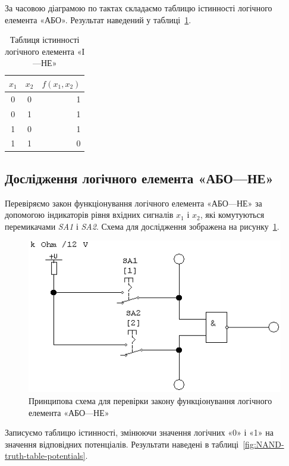 \documentclass[a4paper,oneside,DIV=10,12pt]{scrartcl}
\newcommand\schel[1]{\textit{#1}}
\begin{document}
			За часовою діаграмою по тактах складаємо таблицю істинності логічного елемента «АБО». Результат наведений у таблиці~\ref{fig:NAND-truth-table}.
			
			\begin{table}[!htbp]
			\centering
				\begin{tabular}{ccr}
					\toprule
						$x_1$ & $x_2$ & $f(x_1, x_2)$\\
					\midrule
						0     & 0     & 1\\
						0     & 1     & 1\\
						1     & 0     & 1\\
						1     & 1     & 0\\
					\bottomrule
				\end{tabular}
			\caption{Таблиця істинності логічного елемента «І—НЕ»}
			\label{fig:NAND-truth-table}
			\end{table}
			
		\subsection{Дослідження логічного елемента «АБО—НЕ»}
			Перевіряємо закон функціонування логічного елемента «АБО—НЕ» за допомогою індикаторів рівня вхідних сигналів $x_1$ і $x_2$, які комутуються перемикачами \schel{SA1} і \schel{SA2}. Схема для дослідження зображена на рисунку~\ref{fig:NOR-function-law-schematic}.
			
			\begin{figure}[!htbp]
			\centering
				\includegraphics[]{schematics/05-01-NOR.png}
			\caption{Принципова схема для перевірки закону функціонування логічного елемента «АБО—НЕ»}
			\label{fig:NOR-function-law-schematic}
			\end{figure}
			
			Записуємо таблицю істинності, змінюючи значення логічних «0» і «1» на значення відповідних потенціалів. Результати наведені в таблиці~\ref{fig:NAND-truth-table-potentials}.
			
\end{document}
